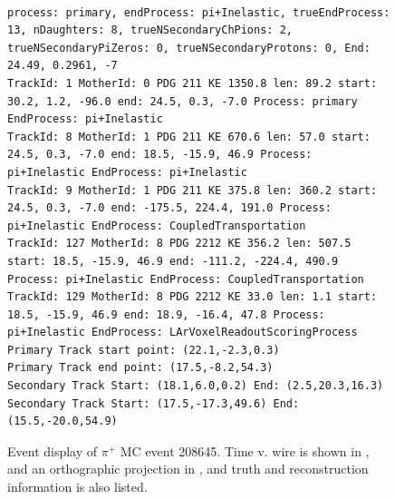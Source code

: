 \documentclass[letterpaper,12pt]{article}
\newcommand{\pip}{\ensuremath{\pi^{+}}}
\begin{document}
\begin{figure}[!hbtp]
\begin{center}
{    }
\\
\begin{lstlisting}
process: primary, endProcess: pi+Inelastic, trueEndProcess: 13, nDaughters: 8, trueNSecondaryChPions: 2, trueNSecondaryPiZeros: 0, trueNSecondaryProtons: 0, End: 24.49, 0.2961, -7
TrackId: 1 MotherId: 0 PDG 211 KE 1350.8 len: 89.2 start: 30.2, 1.2, -96.0 end: 24.5, 0.3, -7.0 Process: primary EndProcess: pi+Inelastic
TrackId: 8 MotherId: 1 PDG 211 KE 670.6 len: 57.0 start: 24.5, 0.3, -7.0 end: 18.5, -15.9, 46.9 Process: pi+Inelastic EndProcess: pi+Inelastic
TrackId: 9 MotherId: 1 PDG 211 KE 375.8 len: 360.2 start: 24.5, 0.3, -7.0 end: -175.5, 224.4, 191.0 Process: pi+Inelastic EndProcess: CoupledTransportation
TrackId: 127 MotherId: 8 PDG 2212 KE 356.2 len: 507.5 start: 18.5, -15.9, 46.9 end: -111.2, -224.4, 490.9 Process: pi+Inelastic EndProcess: CoupledTransportation
TrackId: 129 MotherId: 8 PDG 2212 KE 33.0 len: 1.1 start: 18.5, -15.9, 46.9 end: 18.9, -16.4, 47.8 Process: pi+Inelastic EndProcess: LArVoxelReadoutScoringProcess
Primary Track start point: (22.1,-2.3,0.3)
Primary Track end point: (17.5,-8.2,54.3)
Secondary Track Start: (18.1,6.0,0.2) End: (2.5,20.3,16.3)
Secondary Track Start: (17.5,-17.3,49.6) End: (15.5,-20.0,54.9)
\end{lstlisting}
    \caption{%
                Event display of \pip{} MC event 208645. 
                Time v. wire is shown in , 
                and an orthographic projection in ,
                and truth and reconstruction information is also listed.
            }
    \label{fig:evd_pipMC_208645}
  \end{center}
\end{figure}
\end{document}
